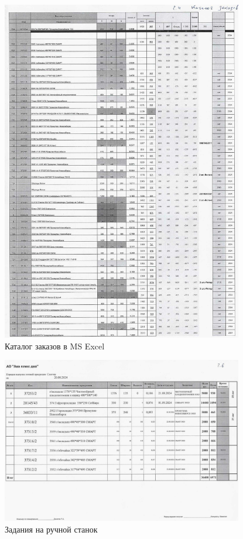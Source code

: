 \begin{figure}
\begin{center}
  \includegraphics[height=0.94\textheight, width=0.94\textwidth, keepaspectratio]{Pics 1/2.4 каталог заказов_0001.jpg}
\end{center}
  \caption{Каталог заказов в MS Excel}
  \label{pic:2.4 каталог заказов_0001}
\end{figure}

\begin{figure}
\begin{center}
  \includegraphics[height=0.94\textheight, width=0.94\textwidth, keepaspectratio]{Pics 1/2.6 Задание на ручной станок в Драм_0001.jpg}
\end{center}
  \caption{Задания на ручной станок}
  \label{pic:2.6 Задание на ручной станок в Драм_0001}
\end{figure}

